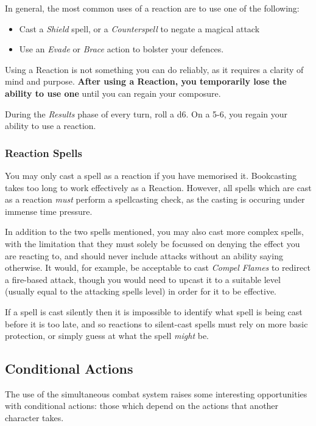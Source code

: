 In general, the most common uses of a reaction are to use one of the following:

\begin{itemize}
	\item Cast a {\it Shield} spell, or a {\it Counterspell} to negate a magical attack
	\item Use an {\it Evade} or {\it Brace} action to bolster your defences. 
\end{itemize}

Using a Reaction is not something you can do reliably, as it requires a clarity of mind and purpose. {\bf After using a Reaction, you temporarily lose the ability to use one} until you can regain your composure. 

During the {\it Results} phase of every turn, roll a d6. On a 5-6, you regain your ability to use a reaction.

\subsubsection{Reaction Spells}

You may only cast a spell as a reaction if you have memorised it. Bookcasting takes too long to work effectively as a Reaction. However, all spells which are cast as a reaction {\it must} perform a spellcasting check, as the casting is occuring under immense time pressure. 

In addition to the two spells mentioned, you may also cast more complex spells, with the limitation that they must solely be focussed on denying the effect you are reacting to, and should never include attacks without an ability saying otherwise. It would, for example, be acceptable to cast {\it Compel Flames} to redirect a fire-based attack, though you would need to upcast it to a suitable level (usually equal to the attacking spell\apos{}s level) in order for it to be effective. 

If a spell is cast silently then it is impossible to identify what spell is being cast before it is too late, and so reactions to silent-cast spells must rely on more basic protection, or simply guess at what the spell {\it might} be. 



\subsection{Conditional Actions}

The use of the simultaneous combat system raises some interesting opportunities with conditional actions: those which depend on the actions that another character takes.

